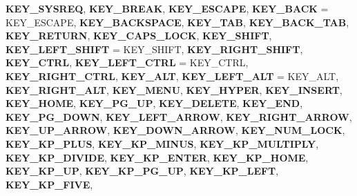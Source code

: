 \begin{DoxyCompactItemize}
{\bfseries K\+E\+Y\+\_\+\+S\+Y\+S\+R\+EQ}, 
{\bfseries K\+E\+Y\+\_\+\+B\+R\+E\+AK}, 
\newline
{\bfseries K\+E\+Y\+\_\+\+E\+S\+C\+A\+PE}, 
{\bfseries K\+E\+Y\+\_\+\+B\+A\+CK} = K\+E\+Y\+\_\+\+E\+S\+C\+A\+PE, 
{\bfseries K\+E\+Y\+\_\+\+B\+A\+C\+K\+S\+P\+A\+CE}, 
{\bfseries K\+E\+Y\+\_\+\+T\+AB}, 
\newline
{\bfseries K\+E\+Y\+\_\+\+B\+A\+C\+K\+\_\+\+T\+AB}, 
{\bfseries K\+E\+Y\+\_\+\+R\+E\+T\+U\+RN}, 
{\bfseries K\+E\+Y\+\_\+\+C\+A\+P\+S\+\_\+\+L\+O\+CK}, 
{\bfseries K\+E\+Y\+\_\+\+S\+H\+I\+FT}, 
\newline
{\bfseries K\+E\+Y\+\_\+\+L\+E\+F\+T\+\_\+\+S\+H\+I\+FT} = K\+E\+Y\+\_\+\+S\+H\+I\+FT, 
{\bfseries K\+E\+Y\+\_\+\+R\+I\+G\+H\+T\+\_\+\+S\+H\+I\+FT}, 
{\bfseries K\+E\+Y\+\_\+\+C\+T\+RL}, 
{\bfseries K\+E\+Y\+\_\+\+L\+E\+F\+T\+\_\+\+C\+T\+RL} = K\+E\+Y\+\_\+\+C\+T\+RL, 
\newline
{\bfseries K\+E\+Y\+\_\+\+R\+I\+G\+H\+T\+\_\+\+C\+T\+RL}, 
{\bfseries K\+E\+Y\+\_\+\+A\+LT}, 
{\bfseries K\+E\+Y\+\_\+\+L\+E\+F\+T\+\_\+\+A\+LT} = K\+E\+Y\+\_\+\+A\+LT, 
{\bfseries K\+E\+Y\+\_\+\+R\+I\+G\+H\+T\+\_\+\+A\+LT}, 
\newline
{\bfseries K\+E\+Y\+\_\+\+M\+E\+NU}, 
{\bfseries K\+E\+Y\+\_\+\+H\+Y\+P\+ER}, 
{\bfseries K\+E\+Y\+\_\+\+I\+N\+S\+E\+RT}, 
{\bfseries K\+E\+Y\+\_\+\+H\+O\+ME}, 
\newline
{\bfseries K\+E\+Y\+\_\+\+P\+G\+\_\+\+UP}, 
{\bfseries K\+E\+Y\+\_\+\+D\+E\+L\+E\+TE}, 
{\bfseries K\+E\+Y\+\_\+\+E\+ND}, 
{\bfseries K\+E\+Y\+\_\+\+P\+G\+\_\+\+D\+O\+WN}, 
\newline
{\bfseries K\+E\+Y\+\_\+\+L\+E\+F\+T\+\_\+\+A\+R\+R\+OW}, 
{\bfseries K\+E\+Y\+\_\+\+R\+I\+G\+H\+T\+\_\+\+A\+R\+R\+OW}, 
{\bfseries K\+E\+Y\+\_\+\+U\+P\+\_\+\+A\+R\+R\+OW}, 
{\bfseries K\+E\+Y\+\_\+\+D\+O\+W\+N\+\_\+\+A\+R\+R\+OW}, 
\newline
{\bfseries K\+E\+Y\+\_\+\+N\+U\+M\+\_\+\+L\+O\+CK}, 
{\bfseries K\+E\+Y\+\_\+\+K\+P\+\_\+\+P\+L\+US}, 
{\bfseries K\+E\+Y\+\_\+\+K\+P\+\_\+\+M\+I\+N\+US}, 
{\bfseries K\+E\+Y\+\_\+\+K\+P\+\_\+\+M\+U\+L\+T\+I\+P\+LY}, 
\newline
{\bfseries K\+E\+Y\+\_\+\+K\+P\+\_\+\+D\+I\+V\+I\+DE}, 
{\bfseries K\+E\+Y\+\_\+\+K\+P\+\_\+\+E\+N\+T\+ER}, 
{\bfseries K\+E\+Y\+\_\+\+K\+P\+\_\+\+H\+O\+ME}, 
{\bfseries K\+E\+Y\+\_\+\+K\+P\+\_\+\+UP}, 
\newline
{\bfseries K\+E\+Y\+\_\+\+K\+P\+\_\+\+P\+G\+\_\+\+UP}, 
{\bfseries K\+E\+Y\+\_\+\+K\+P\+\_\+\+L\+E\+FT}, 
{\bfseries K\+E\+Y\+\_\+\+K\+P\+\_\+\+F\+I\+VE}, 

\end{DoxyCompactItemize}

